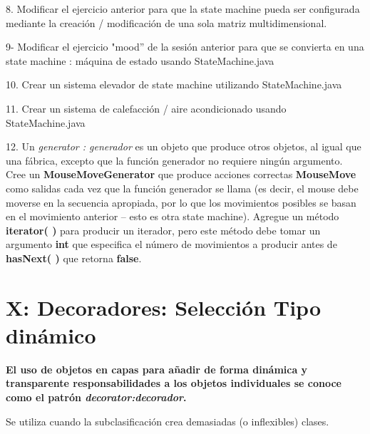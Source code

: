 \documentclass{article}
\begin{document}
8. Modificar el ejercicio anterior para que la state machine pueda ser configurada mediante la creación / modificación de una sola matriz multidimensional. \newline

9- Modificar el ejercicio  "mood” de la sesión anterior para que se convierta en una  state machine : máquina de estado usando StateMachine.java     \newline

10. Crear un sistema elevador de state machine utilizando StateMachine.java     \newline

11. Crear un sistema de calefacción / aire acondicionado usando StateMachine.java   \newline

12. Un \textit{generator : generador} es un objeto que produce otros objetos, al igual que una fábrica, excepto que la función generador no requiere ningún argumento. Cree un \textbf{MouseMoveGenerator} que produce acciones correctas \textbf{MouseMove} como salidas cada vez que la función generador se llama (es decir, el mouse debe moverse en la secuencia apropiada, por lo que los movimientos posibles se basan en el movimiento anterior – esto es otra state machine). Agregue un método \textbf{iterator( )} para producir un iterador, pero este método debe tomar un argumento  \textbf{int} que especifica el número de movimientos a producir antes de \textbf{hasNext( )} que retorna \textbf{false}.

\section{\texorpdfstring{X: Decoradores: \newline  Selección Tipo dinámico}{X: Decoradores:  Selección Tipo dinámico}}

\textbf{El uso de objetos en capas para añadir de forma dinámica y transparente responsabilidades a los objetos individuales se conoce como el patrón \textit{decorator:decorador}.} \newline

Se utiliza cuando la subclasificación crea demasiadas (o inflexibles) clases.   \newline
\end{document}
